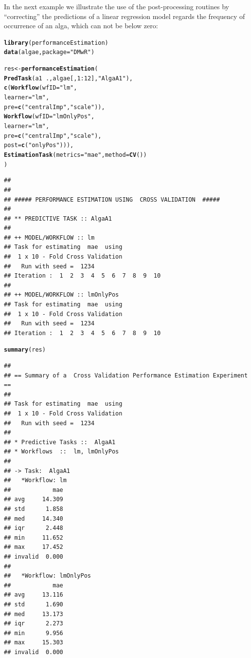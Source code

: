 \documentclass[10pt,a4paper]{article}\usepackage[]{graphicx}\usepackage[]{color}
\makeatletter
\newcommand{\hlnum}[1]{\textcolor[rgb]{0.686,0.059,0.569}{#1}}%
\newcommand{\hlstr}[1]{\textcolor[rgb]{0.192,0.494,0.8}{#1}}%
\newcommand{\hlopt}[1]{\textcolor[rgb]{0,0,0}{#1}}%
\newcommand{\hlstd}[1]{\textcolor[rgb]{0.345,0.345,0.345}{#1}}%
\newcommand{\hlkwb}[1]{\textcolor[rgb]{0.69,0.353,0.396}{#1}}%
\newcommand{\hlkwc}[1]{\textcolor[rgb]{0.333,0.667,0.333}{#1}}%
\newcommand{\hlkwd}[1]{\textcolor[rgb]{0.737,0.353,0.396}{\textbf{#1}}}%
\newenvironment{kframe}{%
 \def\at@end@of@kframe{}%
 \ifinner\ifhmode%
  \def\at@end@of@kframe{\end{minipage}}%
  \begin{minipage}{\columnwidth}%
 \fi\fi%
 \def\FrameCommand##1{\hskip\@totalleftmargin \hskip-\fboxsep
 \colorbox{shadecolor}{##1}\hskip-\fboxsep
     \hskip-\linewidth \hskip-\@totalleftmargin \hskip\columnwidth}%
 \MakeFramed {\advance\hsize-\width
   \@totalleftmargin\z@ \linewidth\hsize
   \@setminipage}}%
 {\par\unskip\endMakeFramed%
 \at@end@of@kframe}
\newenvironment{knitrout}{}{} %
\makeatother
\begin{document}
In the next example we illustrate the use of the post-processing routines by ``correcting'' the predictions of a linear regression model regards the frequency of occurrence of an alga, which can not be below zero:

\begin{knitrout}\footnotesize
{}\color{fgcolor}\begin{kframe}
\begin{alltt}
\hlkwd{library}\hlstd{(performanceEstimation)}
\hlkwd{data}\hlstd{(algae,}\hlkwc{package}\hlstd{=}\hlstr{"DMwR"}\hlstd{)}

\hlstd{res} \hlkwb{<-} \hlkwd{performanceEstimation}\hlstd{(}
         \hlkwd{PredTask}\hlstd{(a1} \hlopt{~} \hlstd{.,algae[,}\hlnum{1}\hlopt{:}\hlnum{12}\hlstd{],}\hlstr{"AlgaA1"}\hlstd{),}
         \hlkwd{c}\hlstd{(}\hlkwd{Workflow}\hlstd{(}\hlkwc{wfID}\hlstd{=}\hlstr{"lm"}\hlstd{,}
                    \hlkwc{learner}\hlstd{=}\hlstr{"lm"}\hlstd{,}
                    \hlkwc{pre}\hlstd{=}\hlkwd{c}\hlstd{(}\hlstr{"centralImp"}\hlstd{,}\hlstr{"scale"}\hlstd{)),}
           \hlkwd{Workflow}\hlstd{(}\hlkwc{wfID}\hlstd{=}\hlstr{"lmOnlyPos"}\hlstd{,}
                    \hlkwc{learner}\hlstd{=}\hlstr{"lm"}\hlstd{,}
                    \hlkwc{pre}\hlstd{=}\hlkwd{c}\hlstd{(}\hlstr{"centralImp"}\hlstd{,}\hlstr{"scale"}\hlstd{),}
                    \hlkwc{post}\hlstd{=}\hlkwd{c}\hlstd{(}\hlstr{"onlyPos"}\hlstd{))),}
         \hlkwd{EstimationTask}\hlstd{(}\hlkwc{metrics}\hlstd{=}\hlstr{"mae"}\hlstd{,}\hlkwc{method}\hlstd{=}\hlkwd{CV}\hlstd{())}
         \hlstd{)}
\end{alltt}
\begin{verbatim}
## 
## 
## ##### PERFORMANCE ESTIMATION USING  CROSS VALIDATION  #####
## 
## ** PREDICTIVE TASK :: AlgaA1
## 
## ++ MODEL/WORKFLOW :: lm 
## Task for estimating  mae  using
##  1 x 10 - Fold Cross Validation
## 	 Run with seed =  1234 
## Iteration :  1  2  3  4  5  6  7  8  9  10
## 
## ++ MODEL/WORKFLOW :: lmOnlyPos 
## Task for estimating  mae  using
##  1 x 10 - Fold Cross Validation
## 	 Run with seed =  1234 
## Iteration :  1  2  3  4  5  6  7  8  9  10
\end{verbatim}
\begin{alltt}
\hlkwd{summary}\hlstd{(res)}
\end{alltt}
\begin{verbatim}
## 
## == Summary of a  Cross Validation Performance Estimation Experiment ==
## 
## Task for estimating  mae  using
##  1 x 10 - Fold Cross Validation
## 	 Run with seed =  1234 
## 
## * Predictive Tasks ::  AlgaA1
## * Workflows  ::  lm, lmOnlyPos 
## 
## -> Task:  AlgaA1
##   *Workflow: lm 
##            mae
## avg     14.309
## std      1.858
## med     14.340
## iqr      2.448
## min     11.652
## max     17.452
## invalid  0.000
## 
##   *Workflow: lmOnlyPos 
##            mae
## avg     13.116
## std      1.690
## med     13.173
## iqr      2.273
## min      9.956
## max     15.303
## invalid  0.000
\end{verbatim}
\end{kframe}
\end{knitrout}
\end{document}

